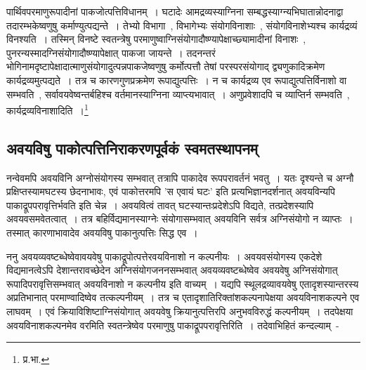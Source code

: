 		{\fontsize{11.7}{0}\selectfont\s पार्थिवपरमाणुरूपादीनां पाकजोत्पत्तिविधानम्~। घटादेः आमद्रव्यस्याग्निना सम्बद्धस्याग्न्यभिघातान्नोदनाद्वा तदारम्भकेष्वणुषु कर्माण्युत्पद्यन्ते~। तेभ्यो विभागा~, विभागेभ्यः संयोगविनाशाः~, संयोगविनाशेभ्यश्च कार्यद्रव्यं विनश्यति~। तस्मिन् विनष्टे स्वतन्त्रेषु परमाणुष्वाग्निसंयोगादौष्ण्यापेक्षाच्छ्यामादीनां विनाशः~, पुनरन्यस्मादग्निसंयोगादौष्ण्यापेक्षात् पाकजा जायन्ते~। तदनन्तरं भोगिनामदृष्टापेक्षादात्माणुसंयोगादुत्पन्नपाकजेष्वणुषु कर्मोत्पत्तौ तेषां परस्परसंयोगाद् द्व्यणुकादिक्रमेण कार्यद्रव्यमुत्पद्यते~। तत्र च कारणगुणप्रक्रमेण रूपाद्युत्पत्तिः~।  न च कार्यद्रव्य एव रूपाद्युत्पत्तिर्विनाशो वा सम्भवति~, सर्वावयवेष्वन्तर्बहिश्च वर्तमानस्याग्निना व्याप्त्यभावात्~। अणुप्रवेशादपि च व्याप्तिर्न सम्भवति~, कार्यद्रव्यविनाशादिति~।\footnote{प्र.भा.}}

		\subsection{अवयविषु पाकोत्पत्तिनिराकरणपूर्वकं स्वमतस्थापनम्}

		नन्वेवमपि अवयविनि अग्नोसंयोगस्य सम्भवात् तत्रापि पाकादेव रूपपरावर्तनं भवतु~। यतः दृश्यन्ते च अग्नौ प्रक्षिप्तस्यामघटस्य छेदनाभावः, एवं पाकोत्तरमपि 'स एवायं घटः' इति प्रत्यभिज्ञानदर्शनात् अवयविन्यपि पाकाद्रूपपरावृत्तिर्भवति इति चेन्न~। अवयवित्वं तावत् घटस्यान्तःप्रदेशेऽपि विद्यते, तत्प्रदेशस्यापि अवयवसमवेतत्वात्~। तत्र बहिर्विद्यमानस्याग्नेः संयोगासम्भवात् अवयविनि सर्वत्र अग्निसंयोगो न व्याप्तः~। तस्मात् कारणाभावादेव अवयविषु पाकानुत्पत्तिः सिद्ध एव~। 

		ननु अवयव्यवष्टब्धेष्वेवावयवेषु पाकाद्रूपोत्पत्तेरवयविनाशो न कल्पनीयः~। अवयवसंयोगस्य एकदेशे विद्यमानत्वेऽपि देशान्तरावच्छेदेन अग्निसंयोगजननसम्भवात् अवयव्यवष्टब्धेष्वेव अवयवेषु अग्निसंयोगात् रूपादिपरावृत्तिसम्भवात् अवयविनाशो न कल्पनीय इति वाच्यम्~। यद्यपि स्थूलद्रव्यावयवेषु एतादृशस्यान्तरस्य अप्रतिभानात् परमाण्वादिष्वेव तत्कल्पनीयम्~। तत्र च एतादृशातिरिक्तांशकल्पनापेक्षया अवयविनाशकल्पने एव लाघवम्~। एवं क्रियाविशिष्टाग्निसंयोगात् अवयवेषु क्रियानुत्पत्तिरपि अनुभवविरुद्धं कल्पनीयम्~। तदपेक्षया अवयविनाशकल्पनमेव वरमिति स्वतन्त्रेष्वेव परमाणुषु पाकाद्रूपपरावृत्तिरिति~। तदेवाभिहितं कन्दल्याम्~-

